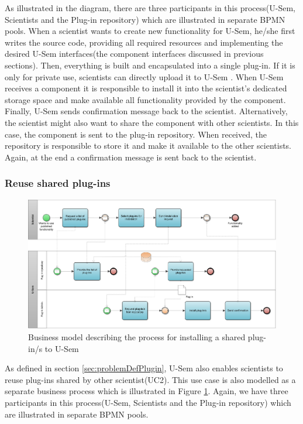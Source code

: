 As illustrated in the diagram, there are three participants in this process(U-Sem, Scientists and the Plug-in repository) which are illustrated in separate BPMN pools. When a scientist wants to create new functionality for U-Sem, he/she first writes the source code, providing all required resources and implementing the desired U-Sem interfaces(the component interfaces discussed in previous sections). Then, everything is built and encapsulated into a single plug-in. If it is only for private use, scientists can directly upload it to U-Sem . When U-Sem receives a component it is responsible to install it into the scientist's dedicated storage space and make available all functionality provided by the component. Finally, U-Sem sends confirmation message back to the scientist. Alternatively, the scientist might also want to share the component with other scientists. In this case, the component is sent to the plug-in repository. When received, the repository is responsible to store it and make it available to the other scientists. Again, at the end a confirmation message is sent back to the scientist.

\subsubsection{Reuse shared plug-ins}

\begin{figure}[h!]
  \centering
  	\includegraphics[scale=0.7,angle=270]{plug-in/business_processes/InstallPlugInFromRepoBusinessModel.jpg}
  \caption{Business model describing the process for installing a shared plug-in/s to U-Sem}
  \label{fig_repo_bpm}
\end{figure}

As defined in section \ref{sec:problemDefPlugin}, U-Sem also enables scientists to reuse plug-ins shared by other scientist(UC2). This use case is also modelled as a separate business process which is illustrated in Figure \ref{fig_repo_bpm}. Again, we have three participants in this process(U-Sem, Scientists and the Plug-in repository) which are illustrated in separate BPMN pools. 


